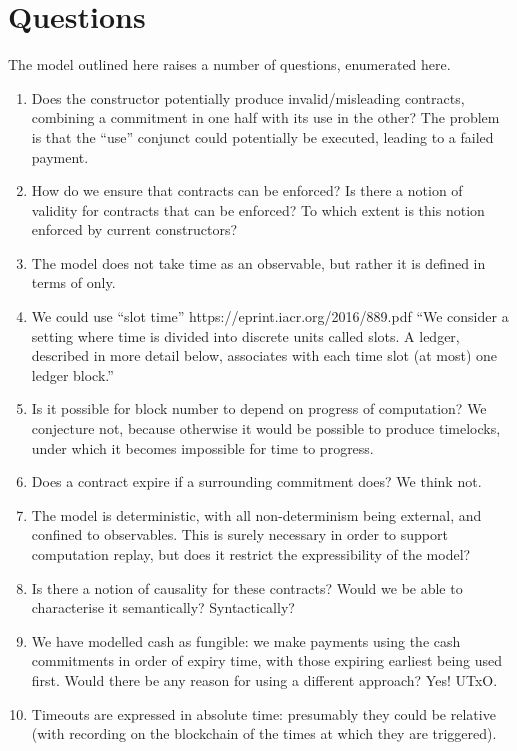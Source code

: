 \documentclass[
      acmsmall
    , screen
    , review=true
  ]{acmart}
\begin{document}
\section{Questions}

The model outlined here raises a number of questions, enumerated here.


\begin{enumerate}
\item Does the  constructor potentially produce invalid/misleading contracts, combining a commitment in one half with its use in the other? The problem is that the ``use'' conjunct could potentially be executed, leading to a failed payment.
\item How do we ensure that contracts can be enforced? Is there a notion of validity for contracts that can be enforced? To which extent is this notion enforced by current constructors?
\item The model does not take time as an observable, but rather it is defined in terms of  only. 
\item We could use ``slot time'' https://eprint.iacr.org/2016/889.pdf ``We consider a setting where time is divided into discrete units called slots. A ledger, described in more detail below, associates with each time slot (at most) one ledger block.''
\item Is it possible for block number to depend on progress of computation? We conjecture not, because otherwise it would be possible to produce timelocks, under which it becomes impossible for time to progress. 
\item Does a contract expire if a surrounding commitment does? We think not.
\item The model is deterministic, with all non-determinism being external, and confined to observables. This is surely necessary in order to support computation replay, but does it restrict the expressibility of the model?
\item Is there a notion of causality for these contracts? Would we be able to characterise it semantically? Syntactically?
\item We have modelled cash as fungible: we make payments using the cash commitments in order of expiry time, with those expiring earliest being used first. Would there be any reason for using a different approach? Yes! UTxO.
\item Timeouts are expressed in absolute time: presumably they could be relative (with recording on the blockchain of the times at which they are triggered).

\end{enumerate}
\end{document}
